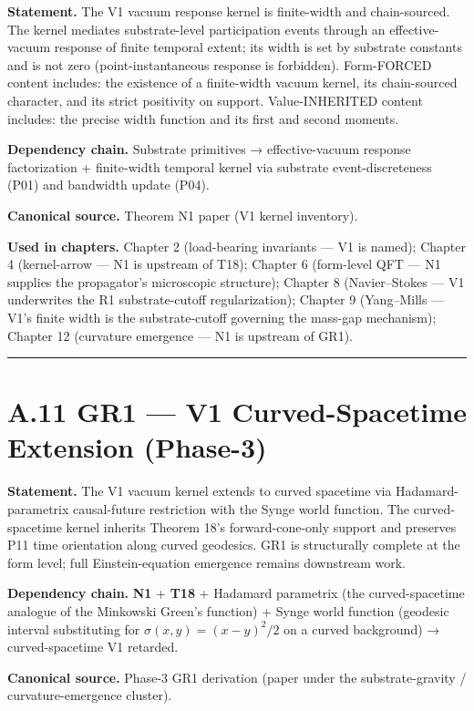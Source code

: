\documentclass[11pt]{book}
\begin{document}
\textbf{Statement.} The V1 vacuum response kernel is finite-width and chain-sourced. The kernel mediates substrate-level participation events through an effective-vacuum response of finite temporal extent; its width is set by substrate constants and is not zero (point-instantaneous response is forbidden). Form-FORCED content includes: the existence of a finite-width vacuum kernel, its chain-sourced character, and its strict positivity on support. Value-INHERITED content includes: the precise width function and its first and second moments.

\textbf{Dependency chain.} Substrate primitives → effective-vacuum response factorization + finite-width temporal kernel via substrate event-discreteness (P01) and bandwidth update (P04).

\textbf{Canonical source.} Theorem N1 paper (V1 kernel inventory).

\textbf{Used in chapters.} Chapter 2 (load-bearing invariants — V1 is named); Chapter 4 (kernel-arrow — N1 is upstream of T18); Chapter 6 (form-level QFT — N1 supplies the propagator's microscopic structure); Chapter 8 (Navier–Stokes — V1 underwrites the R1 substrate-cutoff regularization); Chapter 9 (Yang–Mills — V1's finite width is the substrate-cutoff governing the mass-gap mechanism); Chapter 12 (curvature emergence — N1 is upstream of GR1).

\bigskip\hrule\bigskip

\section{A.11 GR1 — V1 Curved-Spacetime Extension (Phase-3)}

\textbf{Statement.} The V1 vacuum kernel extends to curved spacetime via Hadamard-parametrix causal-future restriction with the Synge world function. The curved-spacetime kernel inherits Theorem 18's forward-cone-only support and preserves P11 time orientation along curved geodesics. GR1 is structurally complete at the form level; full Einstein-equation emergence remains downstream work.

\textbf{Dependency chain.} \textbf{N1} + \textbf{T18} + Hadamard parametrix (the curved-spacetime analogue of the Minkowski Green's function) + Synge world function (geodesic interval substituting for $\sigma(x,y) = (x-y)^2/2$ on a curved background) → curved-spacetime V1 retarded.

\textbf{Canonical source.} Phase-3 GR1 derivation (paper under the substrate-gravity / curvature-emergence cluster).
\end{document}
